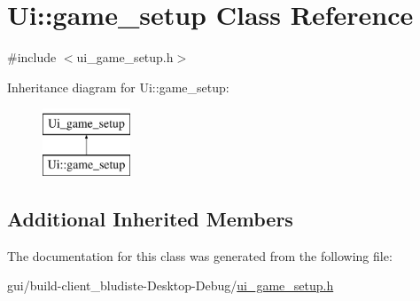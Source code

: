 \hypertarget{classUi_1_1game__setup}{\section{Ui\-:\-:game\-\_\-setup Class Reference}
\label{classUi_1_1game__setup}
}


{\ttfamily \#include $<$ui\-\_\-game\-\_\-setup.\-h$>$}

Inheritance diagram for Ui\-:\-:game\-\_\-setup\-:\begin{figure}[H]
\begin{center}
\leavevmode
\includegraphics[height=2.000000cm]{classUi_1_1game__setup}
\end{center}
\end{figure}
\subsection*{Additional Inherited Members}


The documentation for this class was generated from the following file\-:\begin{DoxyCompactItemize}
\item 
gui/build-\/client\-\_\-bludiste-\/\-Desktop-\/\-Debug/\hyperlink{ui__game__setup_8h}{ui\-\_\-game\-\_\-setup.\-h}\end{DoxyCompactItemize}
